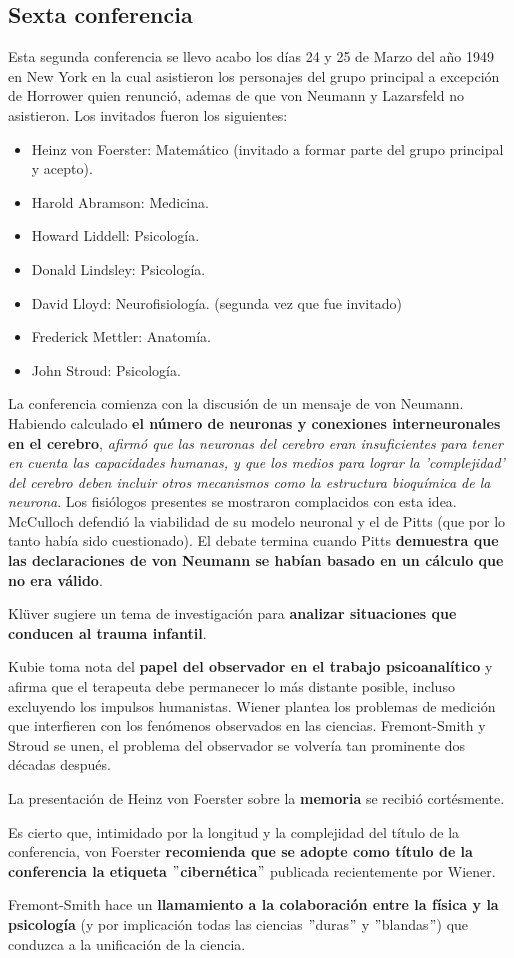 \documentclass[11pt]{article}
\begin{document}
		\subsection{Sexta conferencia}
		Esta segunda conferencia se llevo acabo los días 24 y 25 de Marzo del año 1949 en New York en la cual asistieron los personajes del grupo principal a excepción de Horrower quien renunció, ademas de que von Neumann y Lazarsfeld no asistieron. Los invitados fueron los siguientes:
		\begin{itemize}
    		\item Heinz von Foerster: Matemático (invitado a formar parte del grupo principal y acepto).
    		\item Harold Abramson: Medicina.
    		\item Howard Liddell: Psicología.
    		\item Donald Lindsley: Psicología.
    		\item David Lloyd: Neurofisiología. (segunda vez que fue invitado)
    		\item Frederick Mettler: Anatomía.
    		\item John Stroud: Psicología.
		\end{itemize}
		La conferencia comienza con la discusión de un mensaje de von Neumann. Habiendo calculado \textbf{el número de neuronas y conexiones interneuronales en el cerebro}, \textit{afirmó que las neuronas del cerebro eran insuficientes para tener en cuenta las capacidades humanas, y que los medios para lograr la 'complejidad' del cerebro deben incluir otros mecanismos como la estructura bioquímica de la neurona}. Los fisiólogos presentes se mostraron complacidos con esta idea. McCulloch defendió la viabilidad de su modelo neuronal y el de Pitts (que por lo tanto había sido cuestionado). El debate termina cuando Pitts \textbf{demuestra que las declaraciones de von Neumann se habían basado en un cálculo que no era válido}.\par
		Klüver sugiere un tema de investigación para \textbf{analizar situaciones que conducen al trauma infantil}.\par
		Kubie toma nota del\textbf{ papel del observador en el trabajo psicoanalítico} y afirma que el terapeuta debe permanecer lo más distante posible, incluso excluyendo los impulsos humanistas. Wiener plantea los problemas de medición que interfieren con los fenómenos observados en las ciencias. Fremont-Smith y Stroud se unen, el problema del observador se volvería tan prominente dos décadas después.\par
		La presentación de Heinz von Foerster sobre la \textbf{memoria} se recibió cortésmente.\par
		Es cierto que, intimidado por la longitud y la complejidad del título de la conferencia, von Foerster \textbf{recomienda que se adopte como título de la conferencia la etiqueta $"$cibernética$"$} publicada recientemente por Wiener.\par
		Fremont-Smith hace un \textbf{llamamiento a la colaboración entre la física y la psicología} (y por implicación todas las ciencias $"$duras$"$ y $"$blandas$"$) que conduzca a la unificación de la ciencia. 
\end{document}

